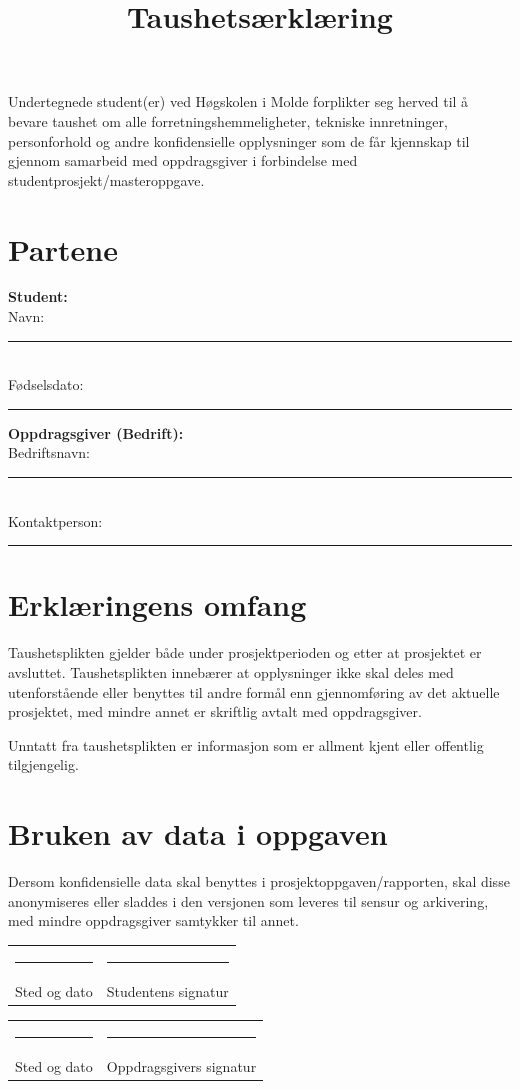 \documentclass[a4paper,12pt]{article}
\title{\textbf{Taushetsærklæring}}
\date{}
\author{}
\begin{document}
\maketitle

\vspace{1cm}

Undertegnede student(er) ved Høgskolen i Molde forplikter seg herved til å bevare taushet om alle forretningshemmeligheter, tekniske innretninger, personforhold og andre konfidensielle opplysninger som de får kjennskap til gjennom samarbeid med oppdragsgiver i forbindelse med studentprosjekt/masteroppgave.

\section*{Partene}

\textbf{Student:} \\
Navn: \rule{8cm}{0.5pt} \\
Fødselsdato: \rule{5cm}{0.5pt}

\vspace{0.5cm}

\textbf{Oppdragsgiver (Bedrift):} \\
Bedriftsnavn: \rule{8cm}{0.5pt} \\
Kontaktperson: \rule{8cm}{0.5pt}

\section*{Erklæringens omfang}
Taushetsplikten gjelder både under prosjektperioden og etter at prosjektet er avsluttet. Taushetsplikten innebærer at opplysninger ikke skal deles med utenforstående eller benyttes til andre formål enn gjennomføring av det aktuelle prosjektet, med mindre annet er skriftlig avtalt med oppdragsgiver.

Unntatt fra taushetsplikten er informasjon som er allment kjent eller offentlig tilgjengelig.

\section*{Bruken av data i oppgaven}
Dersom konfidensielle data skal benyttes i prosjektoppgaven/rapporten, skal disse anonymiseres eller sladdes i den versjonen som leveres til sensur og arkivering, med mindre oppdragsgiver samtykker til annet.

\vspace{2cm}

\noindent
\begin{tabular}{@{}p{7cm}p{7cm}@{}}
\rule{6cm}{0.5pt} & \rule{6cm}{0.5pt} \\
Sted og dato & Studentens signatur \\
\end{tabular}

\vspace{1.5cm}

\noindent
\begin{tabular}{@{}p{7cm}p{7cm}@{}}
\rule{6cm}{0.5pt} & \rule{6cm}{0.5pt} \\
Sted og dato & Oppdragsgivers signatur \\
\end{tabular}
\end{document}
